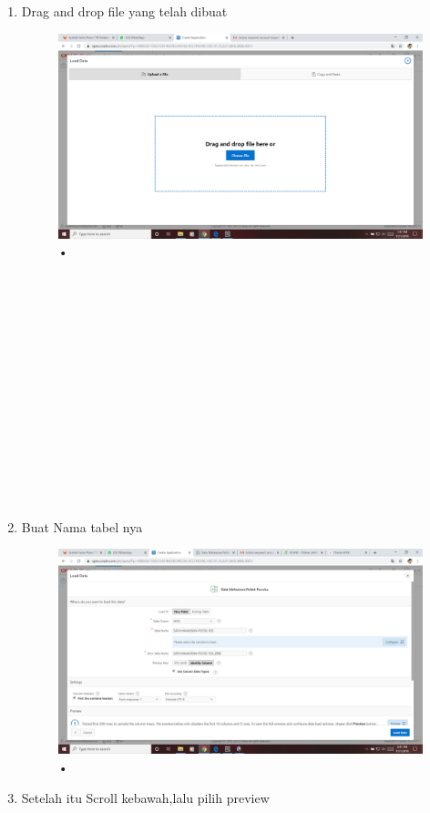 \documentclass[12pt, times new roman, a4paper]{article}
\begin{document}
\begin{enumerate}
\begin{figure}[h]
	\caption{•}
\end{figure}
\item Drag and drop file yang telah dibuat
\begin{figure}[h]
	\centering
		\includegraphics[scale=0.2]{Gambar/Capture6}
	\caption{•}
\end{figure}
\\
\\
\\
\\
\\
\\
\\
\\
\\
\\
\\
\\
\\
\item Buat Nama tabel nya
\begin{figure}[h]
	\centering
		\includegraphics[scale=0.2]{Gambar/Capture7}
	\caption{•}
\end{figure}
\item  Setelah itu Scroll kebawah,lalu pilih preview

\end{enumerate}
\end{document}
